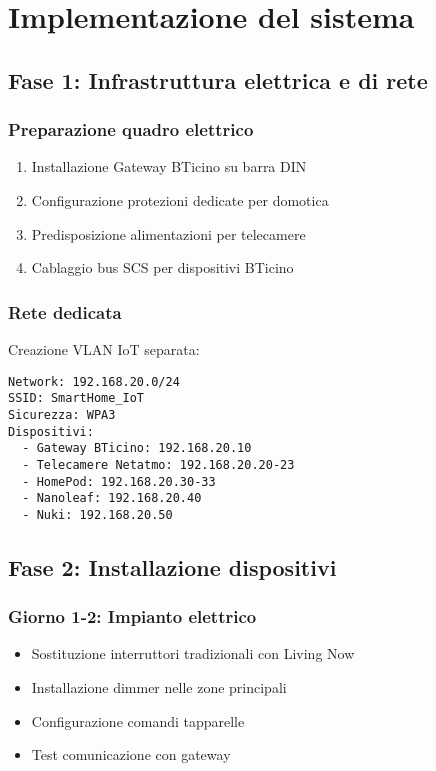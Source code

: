\section{Implementazione del sistema}

\subsection{Fase 1: Infrastruttura elettrica e di rete}

\subsubsection{Preparazione quadro elettrico}

\begin{enumerate}
    \item Installazione Gateway BTicino su barra DIN
    \item Configurazione protezioni dedicate per domotica
    \item Predisposizione alimentazioni per telecamere
    \item Cablaggio bus SCS per dispositivi BTicino
\end{enumerate}

\subsubsection{Rete dedicata}

Creazione VLAN IoT separata:
\begin{verbatim}
Network: 192.168.20.0/24
SSID: SmartHome_IoT
Sicurezza: WPA3
Dispositivi:
  - Gateway BTicino: 192.168.20.10
  - Telecamere Netatmo: 192.168.20.20-23
  - HomePod: 192.168.20.30-33
  - Nanoleaf: 192.168.20.40
  - Nuki: 192.168.20.50
\end{verbatim}

\subsection{Fase 2: Installazione dispositivi}

\subsubsection{Giorno 1-2: Impianto elettrico}

\begin{itemize}
    \item Sostituzione interruttori tradizionali con Living Now
    \item Installazione dimmer nelle zone principali
    \item Configurazione comandi tapparelle
    \item Test comunicazione con gateway
\end{itemize}

